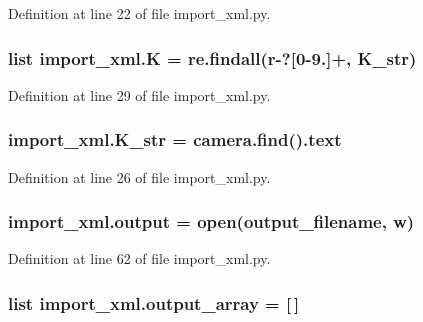 Definition at line 22 of file import\+\_\+xml.\+py.

\subsubsection[{\texorpdfstring{K}{K}}]{\setlength{\rightskip}{0pt plus 5cm}list import\+\_\+xml.\+K = re.\+findall(r\textquotesingle{}-\/?\mbox{[}0-\/9.\mbox{]}+\textquotesingle{}, {\bf K\+\_\+str})}\hypertarget{namespaceimport__xml_a114c9dbaec4f1a19d322303b9f40754e}{}\label{namespaceimport__xml_a114c9dbaec4f1a19d322303b9f40754e}


Definition at line 29 of file import\+\_\+xml.\+py.

\subsubsection[{\texorpdfstring{K\+\_\+str}{K_str}}]{\setlength{\rightskip}{0pt plus 5cm}import\+\_\+xml.\+K\+\_\+str = camera.\+find(\textquotesingle{}).text}\hypertarget{namespaceimport__xml_afadf173b7511d8dc7f7421e25b7e5fe0}{}\label{namespaceimport__xml_afadf173b7511d8dc7f7421e25b7e5fe0}


Definition at line 26 of file import\+\_\+xml.\+py.

\subsubsection[{\texorpdfstring{output}{output}}]{\setlength{\rightskip}{0pt plus 5cm}import\+\_\+xml.\+output = open({\bf output\+\_\+filename}, \textquotesingle{}w\textquotesingle{})}\hypertarget{namespaceimport__xml_a03cb3f12d1861aaa30d97d1e6ba45c9e}{}\label{namespaceimport__xml_a03cb3f12d1861aaa30d97d1e6ba45c9e}


Definition at line 62 of file import\+\_\+xml.\+py.

\subsubsection[{\texorpdfstring{output\+\_\+array}{output_array}}]{\setlength{\rightskip}{0pt plus 5cm}list import\+\_\+xml.\+output\+\_\+array = \mbox{[}$\,$\mbox{]}}\hypertarget{namespaceimport__xml_acbf94a80402f1f3bc6edfcb26847857e}{}\label{namespaceimport__xml_acbf94a80402f1f3bc6edfcb26847857e}


